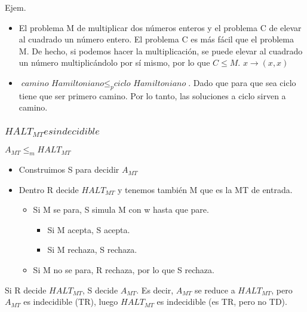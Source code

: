 Ejem. 
\begin{itemize}
    \item El problema M de multiplicar dos números enteros y el problema C de elevar al cuadrado un número entero. El problema C es más fácil que el problema M. De hecho, si podemos hacer la multiplicación, se puede elevar al cuadrado un número multiplicándolo por sí mismo, por lo que $C \leq M$. $x \rightarrow (x,x)$
    \item $\textit{camino Hamiltoniano} \leq_p \textit{ciclo Hamiltoniano}$. Dado que para que sea ciclo tiene que ser primero camino. Por lo tanto, las soluciones a ciclo sirven a camino.
\end{itemize} 

\subsubsection{$HALT_{MT} es indecidible$}
$A_{MT} \leq_m HALT_{MT}$
\begin{itemize}
    \item Construimos S para decidir $A_{MT}$
    \item Dentro R decide $HALT_{MT}$ y tenemos también M que es la MT de entrada. 
    \begin{itemize}
        \item Si M se para, S simula M con w hasta que pare.
        \begin{itemize}
            \item Si M acepta, S acepta.
            \item Si M rechaza, S rechaza.
        \end{itemize}
        \item Si M no se para, R rechaza, por lo que S rechaza.
    \end{itemize}  
\end{itemize}

Si R decide $HALT_{MT}$, S decide $A_{MT}$. Es decir, $A_{MT}$ se reduce a $HALT_{MT}$, pero $A_{MT}$ es indecidible (TR), luego $HALT_{MT}$ es indecidible (es TR, pero no TD).